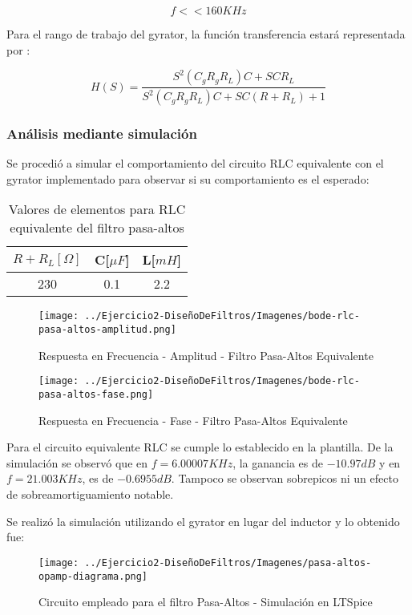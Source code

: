 $$f << 160 KHz$$

Para el rango de trabajo del gyrator, la función transferencia estará representada por :

$$H(S)=\frac{S^{2}(C_gR_gR_L)C + SCR_L}{S^2(C_gR_gR_L)C+SC(R+R_L)+1}$$

\subsubsection{Análisis mediante simulación}

Se procedió a simular el comportamiento del circuito RLC equivalente con el gyrator implementado para observar si su comportamiento es el esperado:

\begin{table}[H]
    \centering
    \begin{tabular}{|c|c|c|}
    \hline
    \rowcolor[HTML]{C0C0C0} 
    $R+R_L[\Omega]$ & C[$\mu F$] & L[$mH$]  \\ \hline
    230      & 0.1  & 2.2 \\ \hline
    \end{tabular}
    \caption{Valores de elementos para RLC equivalente del filtro pasa-altos}
    \end{table}

\begin{figure}[H]
    \centering
    \texttt{[image: ../Ejercicio2-DiseñoDeFiltros/Imagenes/bode-rlc-pasa-altos-amplitud.png]}
    \caption{Respuesta en Frecuencia - Amplitud - Filtro Pasa-Altos Equivalente}
\end{figure}

\begin{figure}[H]
    \centering
    \texttt{[image: ../Ejercicio2-DiseñoDeFiltros/Imagenes/bode-rlc-pasa-altos-fase.png]}
    \caption{Respuesta en Frecuencia - Fase - Filtro Pasa-Altos Equivalente}
\end{figure}

Para el circuito equivalente RLC se cumple lo establecido en la plantilla.
De la simulación se observó que en $f=6.00007 KHz$, la ganancia es de $-10.97 dB$ y en $f=21.003KHz$, es de $-0.6955 dB$.
Tampoco se observan sobrepicos ni un efecto de sobreamortiguamiento notable.

Se realizó la simulación utilizando el gyrator en lugar del inductor y lo obtenido fue:

\begin{figure}[H]
    \centering
    \texttt{[image: ../Ejercicio2-DiseñoDeFiltros/Imagenes/pasa-altos-opamp-diagrama.png]}
    \caption{Circuito empleado para el filtro Pasa-Altos - Simulación en LTSpice}
\end{figure}

